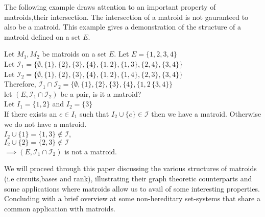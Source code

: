\documentclass[../main.tex]{subfiles}
\begin{document}
The following example draws attention to an important property of matroids,their intersection. The intersection of a matroid is not gauranteed to also be a matroid. This example gives a demonstration of the structure of a matroid defined on a set $E.$
\begin{exmp}
Let $M_1, M_2$ be matroids on a set $E.$ Let $E=\{1,2,3,4\}$\\
\noindent Let $\mathcal{I}_1 = \{\emptyset, \{1\},\{2\},\{3\},\{4\},\{1,2\},\{1,3\},\{2,4\},\{3,4\}\}$\\
\noindent Let $\mathcal{I}_2 = \{\emptyset, \{1\},\{2\},\{3\},\{4\},\{1,2\},\{1,4\},\{2,3\},\{3,4\}\}$\\
\noindent Therefore, $\mathcal{I}_1 \cap \mathcal{I}_2 = \{\emptyset, \{1\},\{2\},\{3\},\{4\},\{1,2\,\{3,4\}\}$\\
let $(E, \mathcal{I}_1 \cap \mathcal{I}_2)$ be a pair, is it a matroid?\\
Let $I_1 = \{1,2\}$ and $I_2=\{3\}$\\
If there exists an $e \in I_1$ such that $I_2 \cup \{e\} \in \mathcal{I}$ then we have a matroid. Otherwise we do not have a matroid.\\
$I_2 \cup \{1\} = \{1,3\} \notin \mathcal{I}$,\\
$I_2 \cup \{2\} = \{2,3\} \notin \mathcal{I}$\\
\noindent $\implies (E, \mathcal{I}_1 \cap \mathcal{I}_2)$ is not a matroid.
\end{exmp}
\noindent We will proceed through this paper discussing the various structures of matroids (i.e circuits,bases and rank), illustrating their graph theoretic counterparts and some applications where matroids allow us to avail of some interesting properties. Concluding with a brief overview at some non-hereditary set-systems that share a common application with matroids.
\end{document}
